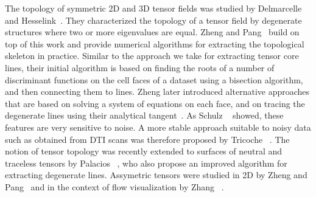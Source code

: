 %
The topology of symmetric \ac{2D} and \ac{3D} tensor fields was studied by
Delmarcelle~\cite{Delmarcelle1994} and Hesselink~\cite{Hesselink1997}.
%
They characterized the topology of a tensor field by degenerate structures
where two or more eigenvalues are equal.
%
Zheng and Pang~\cite{Zheng2004} build on top of this work and provide
numerical algorithms for extracting the topological skeleton in practice.
%
Similar to the approach we take for extracting tensor core lines, their initial
algorithm is based on finding the roots of a number of discriminant functions on
the cell faces of a dataset using a bisection algorithm, and then connecting
them to lines.
%
Zheng \etal later introduced alternative approaches that are based on solving
a system of equations on each face, and on tracing the degenerate lines using
their analytical tangent~\cite{Zheng2005}.
%
As Schulz \etal~\cite{Schultz2007} showed, these features are very sensitive to
noise.
%
A more stable approach suitable to noisy data such as obtained from \ac{DTI}
scans was therefore proposed by Tricoche \etal~\cite{Tricoche2008}.
%
The notion of tensor topology was recently extended to surfaces of neutral and
traceless tensors by Palacios \etal~\cite{Palacios2016}, who also propose an
improved algorithm for extracting degenerate lines.
%
Assymetric tensors were studied in \ac{2D} by Zheng and Pang~\cite{Zheng2005a}
and in the context of flow visualization by Zhang \etal~\cite{Zhang2009}.
%
